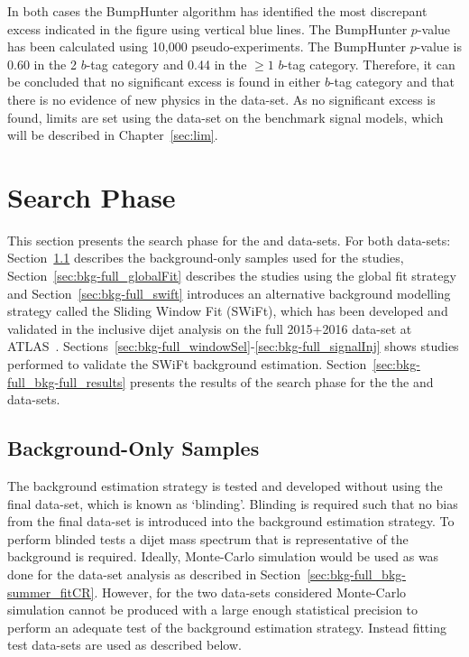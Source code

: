 In both cases the BumpHunter algorithm has identified the most discrepant excess indicated
in the figure using vertical blue lines.
The BumpHunter \mbox{$p$-value} has been calculated using 10,000 pseudo-experiments.
The BumpHunter \mbox{$p$-value} is 0.60 in the 2 $b$-tag category
and 0.44 in the $\geq1$ $b$-tag category.
Therefore, it can be concluded that no significant excess is found in either $b$-tag category
and that there is no evidence of new physics in the \summer{} data-set.
As no significant excess is found, limits are set using the \summer{} data-set on the benchmark signal models,
which will be described in Chapter~\ref{sec:lim}.

\section{\lm{} Search Phase}
\label{sec:bkg-full}

This section presents the search phase for the \hm{} and \lm{} data-sets.
For both data-sets:
Section~\ref{sec:bkg-full_stat:bkgsample} describes the background-only samples used for the studies,
Section~\ref{sec:bkg-full_globalFit} describes the studies using the global fit strategy and
Section~\ref{sec:bkg-full_swift} introduces an alternative background modelling strategy called the Sliding Window Fit (SWiFt),
which has been developed and validated in the inclusive dijet analysis on the full 2015+2016 data-set at ATLAS~\cite{dijet-mori17_paper}.
Sections~\ref{sec:bkg-full_windowSel}-\ref{sec:bkg-full_signalInj} shows studies performed to validate the SWiFt background estimation.
Section~\ref{sec:bkg-full_bkg-full_results} presents the results of the search phase
for the the \hm{} and \lm{} data-sets.

\subsection{Background-Only Samples}
\label{sec:bkg-full_stat:bkgsample}

The background estimation strategy is tested and developed without using the final data-set, which is known as `blinding'.
Blinding is required such that no bias from the final data-set is introduced into the background estimation strategy.
To perform blinded tests a dijet mass spectrum that is representative of the background is required.
Ideally, Monte-Carlo simulation would be used
as was done for the \summer{} data-set analysis as described in Section~\ref{sec:bkg-full_bkg-summer_fitCR}.
However, for the two data-sets considered Monte-Carlo simulation cannot be produced with a large enough statistical
precision to perform an adequate test of the background estimation strategy.
Instead fitting test data-sets are used as described below.

